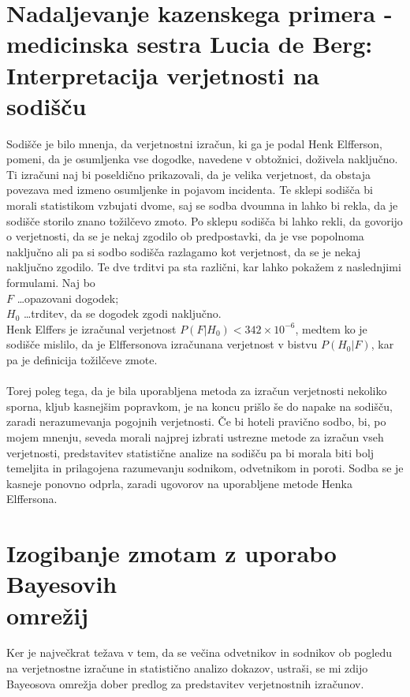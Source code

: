 \documentclass[mat1, tisk]{fmfdelo}
\theoremstyle{definition} %
\theoremstyle{trditev} %
\theoremstyle{izrek}
\begin{document}
\section{Nadaljevanje kazenskega primera - medicinska sestra Lucia de Berg: Interpretacija verjetnosti na sodišču}
Sodišče je bilo mnenja, da verjetnostni izračun, ki ga je podal Henk Elfferson, pomeni, da je osumljenka vse dogodke, navedene v obtožnici, doživela naključno. Ti 
izračuni naj bi poseldično prikazovali, da je velika verjetnost, da obstaja povezava med izmeno osumljenke in pojavom incidenta. Te sklepi sodišča bi morali statistikom 
vzbujati dvome, saj se sodba dvoumna in lahko bi rekla, da je sodišče storilo znano tožilčevo zmoto. Po sklepu sodišča bi lahko rekli, da govorijo o verjetnosti, da se je nekaj zgodilo 
ob predpostavki, da je vse popolnoma naključno ali pa si sodbo sodišča razlagamo kot verjetnost, da se je nekaj naključno zgodilo. Te dve trditvi pa sta različni, kar lahko 
pokažem z naslednjimi formulami. Naj bo\\
$F$ \dots opazovani dogodek;\\
$H_0$ \dots trditev, da se dogodek zgodi naključno.\\
Henk Elffers je izračunal verjetnost $P(F \lvert H_0) < 342 \times 10^{-6}$, medtem ko je sodišče mislilo, da je Elffersonova izračunana  verjetnost v bistvu $P(H_0 \lvert F)$, 
kar pa je definicija tožilčeve zmote.\\\\
Torej poleg tega, da je bila uporabljena metoda za izračun verjetnosti nekoliko sporna, kljub kasnejšim popravkom, je na koncu prišlo še do napake na sodišču, zaradi 
nerazumevanja pogojnih verjetnosti. Če bi hoteli pravično sodbo, bi, po mojem mnenju, seveda morali najprej izbrati ustrezne metode za izračun vseh verjetnosti, predstavitev 
statistične analize na sodišču pa bi morala biti bolj temeljita in prilagojena razumevanju sodnikom, odvetnikom in poroti. Sodba se je kasneje ponovno odprla, 
zaradi ugovorov na uporabljene metode Henka Elffersona.

\section{Izogibanje zmotam z uporabo Bayesovih \\omrežij}
Ker je največkrat težava v tem, da se večina odvetnikov in sodnikov ob pogledu na verjetnostne izračune in statistično analizo dokazov, ustraši, se mi 
zdijo Bayeosova omrežja dober predlog za predstavitev verjetnostnih izračunov.
\end{document}
